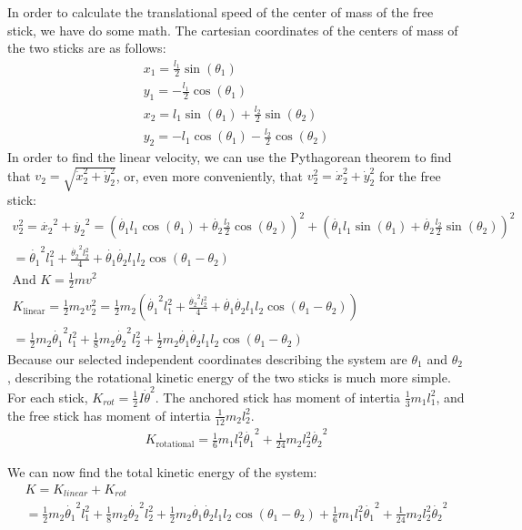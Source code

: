 \documentclass[]{article}
\begin{document}
In order to calculate the translational speed of the center of mass of the free stick, we have do some math. The cartesian coordinates of the centers of mass of the two sticks are as follows:
\begin{gather*}
x_1 = \frac{l_1}{2}\sin(\theta_1) \\
y_1 = -\frac{l_1}{2}\cos(\theta_1) \\
x_2 = l_1\sin(\theta_1) + \frac{l_2}{2}\sin(\theta_2) \\
y_2 = -l_1\cos(\theta_1) - \frac{l_2}{2}\cos(\theta_2)
\end{gather*}
In order to find the linear velocity, we can use the Pythagorean theorem to find that $v_2 = \sqrt{\dot{x}_2^2 + \dot{y}_2^2}$, or, even more conveniently, that $v_2^2 = \dot{x}_2^2 + \dot{y}_2^2$ for the free stick:
\begin{gather*}
	v_2^2 = \dot{x_2}^2 + \dot{y_2}^2 = (\dot{\theta_1}l_1\cos(\theta_1) + \dot{\theta_2}\frac{l_2}{2}\cos(\theta_2))^2 + (\dot{\theta_1}l_1\sin(\theta_1) + \dot{\theta_2}\frac{l_2}{2}\sin(\theta_2))^2 \\
	= \dot{\theta_1}^2l_1^2 + \frac{\dot{\theta_2}^2l_2^2}{4} + \dot{\theta_1}\dot{\theta_2}l_1l_2\cos(\theta_1 - \theta_2) \\
	\text{And $K = \frac12mv^2$} \\
	K_{\text{linear}} = \frac12m_2v_2^2 = \frac12m_2(\dot{\theta_1}^2l_1^2 + \frac{\dot{\theta_2}^2l_2^2}{4} + \dot{\theta_1}\dot{\theta_2}l_1l_2\cos(\theta_1 - \theta_2)) \\
	= \frac12m_2\dot{\theta_1}^2l_1^2 + \frac18m_2\dot{\theta_2}^2l_2^2 + \frac12m_2\dot{\theta_1}\dot{\theta_2}l_1l_2\cos(\theta_1 - \theta_2)
\end{gather*}
Because our selected independent coordinates describing the system are $\theta_1$ and $\theta_2$, describing the rotational kinetic energy of the two sticks is much more simple. For each stick, $K_{rot} = \frac12 I \dot{\theta}^2$. The anchored stick has moment of intertia $\frac13m_1l_1^2$, and the free stick has moment of intertia $\frac{1}{12}m_2l_2^2$.
\begin{gather*}
	K_{\text{rotational}} = \frac16m_1l_1^2\dot{\theta_1}^2 + \frac{1}{24}m_2l_2^2\dot{\theta_2}^2
\end{gather*}

We can now find the total kinetic energy of the system:
\begin{gather*}
	K = K_{linear} + K_{rot} \\
	= \frac12m_2\dot{\theta_1}^2l_1^2 + \frac18m_2\dot{\theta_2}^2l_2^2 + \frac12m_2\dot{\theta_1}\dot{\theta_2}l_1l_2\cos(\theta_1 - \theta_2) + \frac16m_1l_1^2\dot{\theta_1}^2 + \frac{1}{24}m_2l_2^2\dot{\theta_2}^2
\end{gather*}
\end{document}
